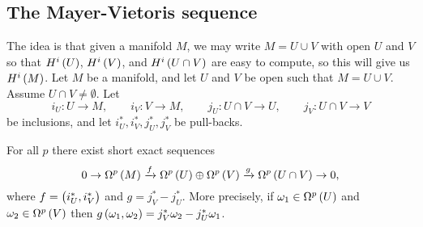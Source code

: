 \pagebreak

\subsection{The Mayer-Vietoris sequence}

The idea is that given a manifold $ M $, we may write $ M = U \cup V $ with open $ U $ and $ V $ so that $ H^i\br{U} $, $ H^i\br{V} $, and $ H^i\br{U \cap V} $ are easy to compute, so this will give us $ H^i\br{M} $. Let $ M $ be a manifold, and let $ U $ and $ V $ be open such that $ M = U \cup V $. Assume $ U \cap V \ne \emptyset $. Let
$$ i_U : U \to M, \qquad i_V : V \to M, \qquad j_U : U \cap V \to U, \qquad j_V : U \cap V \to V $$
be inclusions, and let $ i_U^*, i_V^*, j_U^*, j_V^* $ be pull-backs.

\begin{proposition}
\label{prop:2.28}
For all $ p $ there exist short exact sequences
$$ 0 \to \Omega^p\br{M} \xrightarrow{f} \Omega^p\br{U} \oplus \Omega^p\br{V} \xrightarrow{g} \Omega^p\br{U \cap V} \to 0, $$
where $ f = \br{i_U^*, i_V^*} $ and $ g = j_V^* - j_U^* $. More precisely, if $ \omega_1 \in \Omega^p\br{U} $ and $ \omega_2 \in \Omega^p\br{V} $ then $ g\br{\omega_1, \omega_2} = j_V^*\omega_2 - j_U^*\omega_1 $.
\end{proposition}


